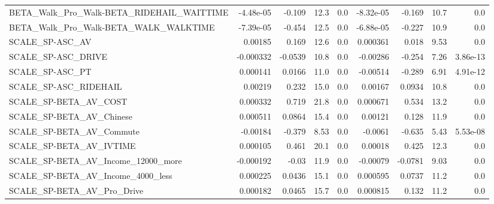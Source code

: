 \begin{tabular}{lrrrrrrrr}
BETA\_Walk\_Pro\_Walk-BETA\_RIDEHAIL\_WAITTIME          &   -4.48e-05 &       -0.109 &      12.3 &      0.0 &  -8.32e-05 &      -0.169 &         10.7 &           0.0 \\
BETA\_Walk\_Pro\_Walk-BETA\_WALK\_WALKTIME              &   -7.39e-05 &       -0.454 &      12.5 &      0.0 &  -6.88e-05 &      -0.227 &         10.9 &           0.0 \\
SCALE\_SP-ASC\_AV                                    &     0.00185 &        0.169 &      12.6 &      0.0 &   0.000361 &       0.018 &         9.53 &           0.0 \\
SCALE\_SP-ASC\_DRIVE                                 &   -0.000332 &      -0.0539 &      10.8 &      0.0 &   -0.00286 &      -0.254 &         7.26 &      3.86e-13 \\
SCALE\_SP-ASC\_PT                                    &    0.000141 &       0.0166 &      11.0 &      0.0 &   -0.00514 &      -0.289 &         6.91 &      4.91e-12 \\
SCALE\_SP-ASC\_RIDEHAIL                              &     0.00219 &        0.232 &      15.0 &      0.0 &    0.00167 &      0.0934 &         10.8 &           0.0 \\
SCALE\_SP-BETA\_AV\_COST                              &    0.000332 &        0.719 &      21.8 &      0.0 &   0.000671 &       0.534 &         13.2 &           0.0 \\
SCALE\_SP-BETA\_AV\_Chinese                           &    0.000511 &       0.0864 &      15.4 &      0.0 &    0.00121 &       0.128 &         11.9 &           0.0 \\
SCALE\_SP-BETA\_AV\_Commute                           &    -0.00184 &       -0.379 &      8.53 &      0.0 &    -0.0061 &      -0.635 &         5.43 &      5.53e-08 \\
SCALE\_SP-BETA\_AV\_IVTIME                            &    0.000105 &        0.461 &      20.1 &      0.0 &    0.00018 &       0.425 &         12.3 &           0.0 \\
SCALE\_SP-BETA\_AV\_Income\_12000\_more                 &   -0.000192 &        -0.03 &      11.9 &      0.0 &   -0.00079 &     -0.0781 &         9.03 &           0.0 \\
SCALE\_SP-BETA\_AV\_Income\_4000\_less                  &    0.000225 &       0.0436 &      15.1 &      0.0 &   0.000595 &      0.0737 &         11.2 &           0.0 \\
SCALE\_SP-BETA\_AV\_Pro\_Drive                         &    0.000182 &       0.0465 &      15.7 &      0.0 &   0.000815 &       0.132 &         11.2 &           0.0 \\

\end{tabular}
